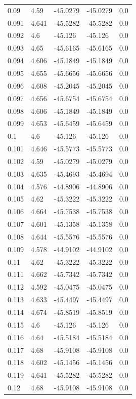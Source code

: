 \begin{table}[H]
\begin{tabular}{lllll}
0.09 & 4.59 & -45.0279 & -45.0279 & 0.0 \\
0.091 & 4.641 & -45.5282 & -45.5282 & 0.0 \\
0.092 & 4.6 & -45.126 & -45.126 & 0.0 \\
0.093 & 4.65 & -45.6165 & -45.6165 & 0.0 \\
0.094 & 4.606 & -45.1849 & -45.1849 & 0.0 \\
0.095 & 4.655 & -45.6656 & -45.6656 & 0.0 \\
0.096 & 4.608 & -45.2045 & -45.2045 & 0.0 \\
0.097 & 4.656 & -45.6754 & -45.6754 & 0.0 \\
0.098 & 4.606 & -45.1849 & -45.1849 & 0.0 \\
0.099 & 4.653 & -45.6459 & -45.6459 & 0.0 \\
0.1 & 4.6 & -45.126 & -45.126 & 0.0 \\
0.101 & 4.646 & -45.5773 & -45.5773 & 0.0 \\
0.102 & 4.59 & -45.0279 & -45.0279 & 0.0 \\
0.103 & 4.635 & -45.4693 & -45.4694 & 0.0 \\
0.104 & 4.576 & -44.8906 & -44.8906 & 0.0 \\
0.105 & 4.62 & -45.3222 & -45.3222 & 0.0 \\
0.106 & 4.664 & -45.7538 & -45.7538 & 0.0 \\
0.107 & 4.601 & -45.1358 & -45.1358 & 0.0 \\
0.108 & 4.644 & -45.5576 & -45.5576 & 0.0 \\
0.109 & 4.578 & -44.9102 & -44.9102 & 0.0 \\
0.11 & 4.62 & -45.3222 & -45.3222 & 0.0 \\
0.111 & 4.662 & -45.7342 & -45.7342 & 0.0 \\
0.112 & 4.592 & -45.0475 & -45.0475 & 0.0 \\
0.113 & 4.633 & -45.4497 & -45.4497 & 0.0 \\
0.114 & 4.674 & -45.8519 & -45.8519 & 0.0 \\
0.115 & 4.6 & -45.126 & -45.126 & 0.0 \\
0.116 & 4.64 & -45.5184 & -45.5184 & 0.0 \\
0.117 & 4.68 & -45.9108 & -45.9108 & 0.0 \\
0.118 & 4.602 & -45.1456 & -45.1456 & 0.0 \\
0.119 & 4.641 & -45.5282 & -45.5282 & 0.0 \\
0.12 & 4.68 & -45.9108 & -45.9108 & 0.0 \\

\end{tabular}
\end{table}
